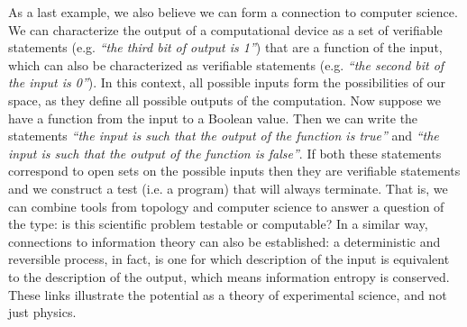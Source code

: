 \documentclass[letterpaper]{article}
\theoremstyle{plain}%
\theoremstyle{definition}
\theoremstyle{remark}
\numberwithin{equation}{section}
\newcommand{\statement}[1] {\emph{``#1''}}
\begin{document}
As a last example, we also believe we can form a connection to computer science. We can characterize the output of a computational device as a set of verifiable statements (e.g. \statement{the third bit of output is 1}) that are a function of the input, which can also be characterized as verifiable statements (e.g. \statement{the second bit of the input is 0}). In this context, all possible inputs form the possibilities of our space, as they define all possible outputs of the computation. Now suppose we have a function from the input to a Boolean value. Then we can write the statements \statement{the input is such that the output of the function is true} and \statement{the input is such that the output of the function is false}. If both these statements correspond to open sets on the possible inputs then they are verifiable statements and we construct a test (i.e. a program) that will always terminate. That is, we can combine tools from topology and computer science to answer a question of the type: is this scientific problem testable or computable? In a similar way, connections to information theory can also be established: a deterministic and reversible process, in fact, is one for which description of the input is equivalent to the description of the output, which means information entropy is conserved. These links illustrate the potential as a theory of experimental science, and not just physics.
\end{document}
